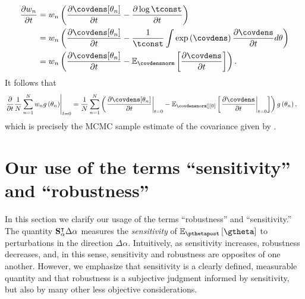 \documentclass{article}\usepackage[]{graphicx}\usepackage[]{color}
\theoremstyle{plain}
\theoremstyle{definition}
\theoremstyle{plain}
\theoremstyle{plain}
\theoremstyle{plain}
\theoremstyle{plain}
\begin{document}
\begin{align*}
\frac{\partial w_{n}}{\partial t} & =w_{n}\left(\frac{\partial\covdens[\theta_{n}]}{\partial t}-\frac{\partial\log\tconst}{\partial t}\right)\\
 & =w_{n}\left(\frac{\partial\covdens[\theta_{n}]}{\partial t}-\frac{1}{\tconst}\int\exp\left(\covdens\right)\frac{\partial\covdens}{\partial t}d\theta\right)\\
 & =w_{n}\left(\frac{\partial\covdens[\theta_{n}]}{\partial t}-\mbe_{\covdensnorm}\left[\frac{\partial\covdens}{\partial t}\right]\right).
\end{align*}
It follows that
\begin{align*}
\left.\frac{\partial}{\partial t}\frac{1}{N}\sum_{n=1}^{N}w_{n}g\left(\theta_{n}\right)\right|_{t=0} & =\frac{1}{N}\sum_{n=1}^{N}\left(\left.\frac{\partial\covdens[\theta_{n}]}{\partial t}\right|_{t=0}-\mbe_{\covdensnorm[][0]}\left[\left.\frac{\partial\covdens}{\partial t}\right|_{t=0}\right]\right)g\left(\theta_{n}\right),
\end{align*}
which is precisely the MCMC sample estimate of the covariance given
by .

\section{Our use of the terms ``sensitivity'' and ``robustness''\label{app:sens_and_robustness}}

In this section we clarify our usage of the terms ``robustness''
and ``sensitivity.'' The quantity $\mathbf{S}_{\alpha}^{\intercal}\Delta\alpha$
measures the \emph{sensitivity} of $\epgtheta$ to perturbations in
the direction $\Delta\alpha$. Intuitively, as sensitivity increases,
robustness decreases, and, in this sense, sensitivity and robustness
are opposites of one another. However, we emphasize that sensitivity
is a clearly defined, measurable quantity and that robustness is a
subjective judgment informed by sensitivity, but also by many other
less objective considerations.
\end{document}
